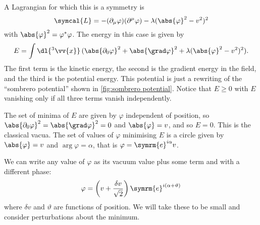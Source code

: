 \documentclass[fleqn]{NotesClass}
\newcommand{\e}{\symrm{e}}
\newcommand{\lagrangianDensity}{\symcal{L}}
\begin{document}
    A Lagrangian for which this is a symmetry is
    \begin{equation}
        \lagrangianDensity = -(\partial_\mu \varphi)(\partial^\mu \varphi) - \lambda(\abs{\varphi}^2 - v^2)^2
    \end{equation}
    with \(\abs{\varphi}^2 = \varphi^*\varphi\).
    The energy in this case is given by
    \begin{equation}
        E = \int \dl{^3\vv{x}} \, (\abs{\partial_0 \varphi}^2 + \abs{\grad \varphi}^2 + \lambda(\abs{\varphi}^2 - v^2)^2).
    \end{equation}
    The first term is the kinetic energy, the second is the gradient energy in the field, and the third is the potential energy.
    This potential is just a rewriting of the \enquote{sombrero potential} shown in \cref{fig:sombrero potential}.
    Notice that \(E \ge 0\) with \(E\) vanishing only if all three terms vanish independently.
    
    The set of minima of \(E\) are given by \(\varphi\) independent of position, so \(\abs{\partial_0 \varphi}^2 = \abs{\grad\varphi}^2 = 0\) and \(\abs{\varphi} = v\), and so \(E = 0\).
    This is the classical vacua.
    The set of values of \(\varphi\) minimising \(E\) is a circle given by \(\abs{\varphi} = v\) and \(\arg \varphi = \alpha\), that is \(\varphi = \e^{i\alpha}v\).
    
    We can write any value of \(\varphi\) as its vacuum value plus some term and with a different phase:
    \begin{equation}
        \varphi = \left( v + \frac{\delta v}{\sqrt{2}} \right) \e^{i(\alpha + \vartheta)}
    \end{equation}
    where \(\delta v\) and \(\vartheta\) are functions of position.
    We will take these to be small and consider perturbations about the minimum.
    
\end{document}
